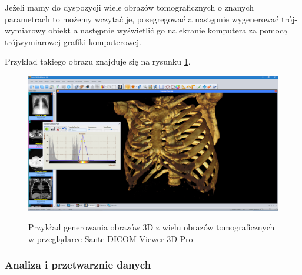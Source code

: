 Jeżeli mamy do dyspozycji wiele obrazów tomograficznych o znanych parametrach to możemy wczytać je, posegregować a następnie wygenerować trój-wymiarowy obiekt a następnie wyświetlić go na ekranie komputera za pomocą trójwymiarowej grafiki komputerowej.

Przykład takiego obrazu znajduje się na rysunku \ref{fig:dicomviewer002}.

\begin{figure}[!htbp]
      \caption{Przykład generowania obrazów 3D z wielu obrazów tomograficznych w przeglądarce \href{https://www.santesoft.com/win/sante-dicom-viewer-3d-pro/sante-dicom-viewer-3d-pro.html}{Sante DICOM Viewer 3D Pro}}
      \includegraphics[width=\textwidth]{img/dicom-viewer-002.png}
      \centering
      \label{fig:dicomviewer002}
\end{figure}

\subsubsection{Analiza i przetwarznie danych}

